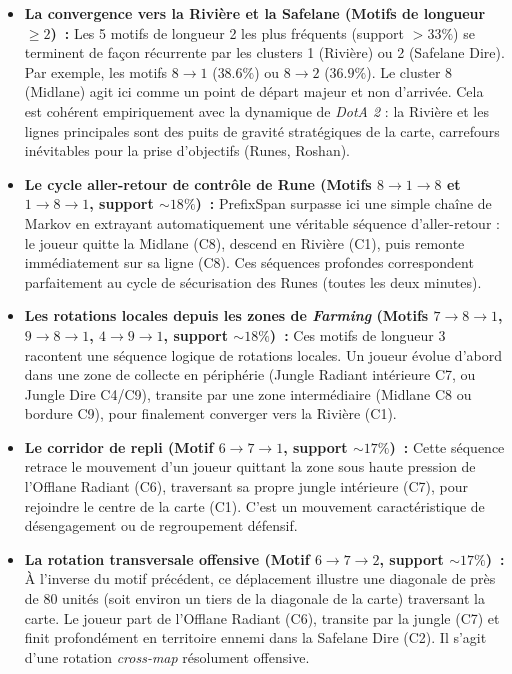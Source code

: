 \documentclass[11pt, a4paper]{article}
\begin{document}
\begin{itemize}
    \item \textbf{La convergence vers la Rivière et la Safelane (Motifs de longueur $\ge 2$)~:}
    Les 5 motifs de longueur 2 les plus fréquents (support $> 33\%$) se terminent de façon récurrente par les clusters 1 (Rivière) ou 2 (Safelane Dire). Par exemple, les motifs $8 \rightarrow 1$ ($38.6\%$) ou $8 \rightarrow 2$ ($36.9\%$). Le cluster 8 (Midlane) agit ici comme un point de départ majeur et non d'arrivée. Cela est cohérent empiriquement avec la dynamique de \textit{DotA 2} : la Rivière et les lignes principales sont des puits de gravité stratégiques de la carte, carrefours inévitables pour la prise d'objectifs (Runes, Roshan).

    \item \textbf{Le cycle aller-retour de contrôle de Rune (Motifs $8 \rightarrow 1 \rightarrow 8$ et $1 \rightarrow 8 \rightarrow 1$, support $\sim 18\%$)~:}
    PrefixSpan surpasse ici une simple chaîne de Markov en extrayant automatiquement une véritable séquence d'aller-retour : le joueur quitte la Midlane (C8), descend en Rivière (C1), puis remonte immédiatement sur sa ligne (C8). Ces séquences profondes correspondent parfaitement au cycle de sécurisation des Runes (toutes les deux minutes).

    \item \textbf{Les rotations locales depuis les zones de \textit{Farming} (Motifs $7 \rightarrow 8 \rightarrow 1$, $9 \rightarrow 8 \rightarrow 1$, $4 \rightarrow 9 \rightarrow 1$, support $\sim 18\%$)~:}
    Ces motifs de longueur 3 racontent une séquence logique de rotations locales. Un joueur évolue d'abord dans une zone de collecte en périphérie (Jungle Radiant intérieure C7, ou Jungle Dire C4/C9), transite par une zone intermédiaire (Midlane C8 ou bordure C9), pour finalement converger vers la Rivière (C1). 

    \item \textbf{Le corridor de repli (Motif $6 \rightarrow 7 \rightarrow 1$, support $\sim 17\%$)~:}
    Cette séquence retrace le mouvement d'un joueur quittant la zone sous haute pression de l'Offlane Radiant (C6), traversant sa propre jungle intérieure (C7), pour rejoindre le centre de la carte (C1). C'est un mouvement caractéristique de désengagement ou de regroupement défensif.

    \item \textbf{La rotation transversale offensive (Motif $6 \rightarrow 7 \rightarrow 2$, support $\sim 17\%$)~:}
    À l'inverse du motif précédent, ce déplacement illustre une diagonale de près de 80 unités (soit environ un tiers de la diagonale de la carte) traversant la carte. Le joueur part de l'Offlane Radiant (C6), transite par la jungle (C7) et finit profondément en territoire ennemi dans la Safelane Dire (C2). Il s'agit d'une rotation \textit{cross-map} résolument offensive.


\end{itemize}
\end{document}
